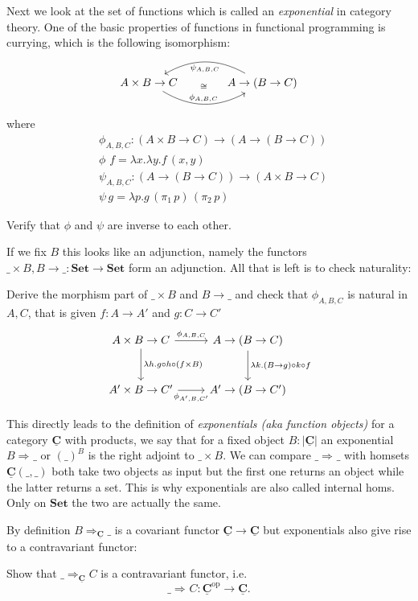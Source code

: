 \documentclass{article}
\newcommand{\Set}{\mathbf{Set}}
\newcommand{\cat}[1]{\underline{\mathbf{#1}}}
\newcommand{\obj}[1]{|#1|}
\newcommand{\homC}[3]{\cat{#1}(#2,#3)}
\newcommand{\op}{\mathrm{op}}
\newcommand{\expC}[3]{#2\Rightarrow_{#1} #3}
\newcommand{\expX}[2]{\expC{}{#1}{#2}}
\begin{document}
Next we look at the set of functions which is called an \emph{exponential} in category theory. One of the basic properties of functions in functional programming is currying, which is the following isomorphism:
\[\begin{tikzcd}[column sep = large]
A\times B \to C \arrow[r,"\phi_{A,B,C}",bend right,"\cong" above=11] & A\to(B \to C) \arrow[l,"\psi_{A,B,C}",bend right]
\end{tikzcd}\]
where
\begin{align*}
  &\phi_{A,B,C} : (A\times B \to C) \to (A\to(B \to C))\\
  &\phi\,\,f = \lambda x.\lambda y.f\,(x,y)\\
  &\psi_{A,B,C} : (A\to(B \to C)) \to (A\times B \to C) \\
  &\psi\,g = \lambda p.g\,(\pi_1\,p)\,(\pi_2\,p)
\end{align*}
\begin{Exercise}
  Verify that $\phi$ and $\psi$ are inverse to each other.
\end{Exercise}
If we fix $B$ this looks like an adjunction, namely the functors $\_\times B, B \to \_ : \Set \to \Set$ form an adjunction. All that is left is to check naturality:
\begin{Exercise}
  Derive the morphism part of $\_\times B$ and $B \to \_$ and
  check that $\phi_{A,B,C}$ is natural in $A,C$, that is given $f : A \to A'$ and $g : C \to C'$
\[\begin{tikzcd}[row sep = large]
   A\times B \to C \arrow[r,"\phi_{A,B,C}"] \arrow[d,"\lambda h. g\circ h \circ (f \times B)"] & A\to(B \to C) \arrow[d,"\lambda k. (B \to g)\circ k \circ f"] \\
   A'\times B \to C'  \arrow[r,"\phi_{A',B,C'}" below]  & A'\to(B \to C') 
\end{tikzcd}\]  
\end{Exercise}

This directly leads to the definition of \emph{exponentials (aka function objects)} for a category $\cat{C}$ with products, we say that for a fixed object $B:\obj{\cat{C}}$ an exponential $\expC{}{B}{\_}$ or $(\_)^B$ is the right adjoint to $\_ \times B$. We can compare $\expC{}{\_}{\_}$ with homsets $\homC{C}{\_}{\_}$ both take two objects as input but the first one returns an object while the latter returns a set. This is why exponentials are also called internal homs. Only on $\Set$ the two are actually the same.

By definition $\expC{\cat{C}}{B}{\_}$ is a covariant functor $\cat{C} \to \cat{C}$ but exponentials also give rise to a contravariant functor:
\begin{Exercise}
Show that $\expC{\cat{C}}{\_}{C}$ is a contravariant functor, i.e. 
\[\expC{}{\_}{C} : \cat{C}^\op \to \cat{C}.\]     
\end{Exercise}
\end{document}
